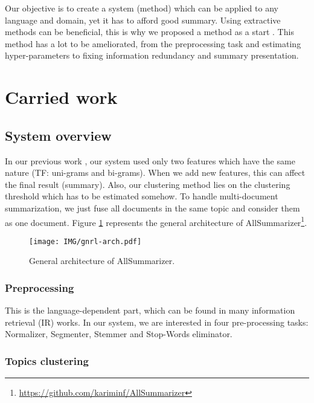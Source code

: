 \documentclass{LCSI_PhD}
\begin{document}
Our objective is to create a system (method) which can be applied to any language and domain, yet it has to afford good summary.
Using extractive methods can be beneficial, this is why we proposed a method as a start \cite{13-aries-al}. 
This method has a lot to be ameliorated, from the preprocessing task and estimating hyper-parameters to fixing information redundancy and summary presentation.

\section{Carried work}

\subsection{System overview}

In our previous work \cite{13-aries-al}, our system used only two features which have the same nature (TF: uni-grams and bi-grams). 
When we add new features, this can affect the final result (summary).
Also, our clustering method lies on the clustering threshold which has to be estimated somehow. 
To handle multi-document summarization, we just fuse all documents in the same topic and consider them as one document.
Figure \ref{fig:gnrl-arch} represents the general architecture of AllSummarizer\footnote{\url{https://github.com/kariminf/AllSummarizer}}.

\begin{figure}[h]
\centering
\texttt{[image: IMG/gnrl-arch.pdf]}
\caption{General architecture of AllSummarizer.}
\label{fig:gnrl-arch}
\end{figure}

\subsubsection{Preprocessing}

This is the language-dependent part, which can be found in many information retrieval (IR) works. 
In our system, we are interested in four pre-processing tasks: Normalizer, Segmenter, Stemmer and Stop-Words eliminator.

\subsubsection{Topics clustering}
\end{document}

